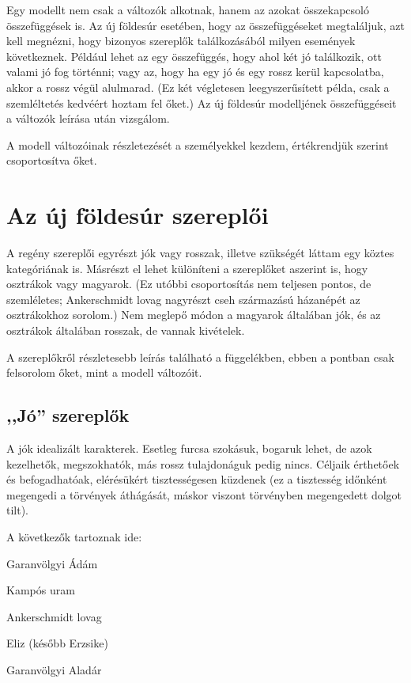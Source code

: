 \documentclass{thesis-ekf}
\begin{document}
    Egy modellt nem csak a változók alkotnak, hanem az azokat összekapcsoló összefüggések is.
    Az új földesúr esetében, hogy az összefüggéseket megtaláljuk, azt kell megnézni, hogy bizonyos szereplők
        találkozásából milyen események következnek.
    Például lehet az egy összefüggés, hogy ahol két jó találkozik, ott valami jó fog történni;
        vagy az, hogy ha egy jó és egy rossz kerül kapcsolatba, akkor a rossz végül alulmarad.
    (Ez két végletesen leegyszerűsített példa, csak a szemléltetés kedvéért hoztam fel őket.)
    Az új földesúr modelljének összefüggéseit a változók leírása után vizsgálom.

    A modell változóinak részletezését a személyekkel kezdem, értékrendjük szerint csoportosítva őket.


    \section{Az új földesúr szereplői}\label{sec:az-uj-foldesur-szereploi}

    A regény szereplői egyrészt jók vagy rosszak, illetve szükségét láttam egy köztes kategóriának is.
    Másrészt el lehet különíteni a szereplőket aszerint is, hogy osztrákok vagy magyarok.
    (Ez utóbbi csoportosítás nem teljesen pontos, de szemléletes;
        Ankerschmidt lovag nagyrészt cseh származású házanépét az osztrákokhoz sorolom.)
    Nem meglepő módon a magyarok általában jók, és az osztrákok általában rosszak, de vannak kivételek.

    A szereplőkről részletesebb leírás található a függelékben, ebben a pontban csak felsorolom őket, mint a modell változóit.

    \subsection{,,Jó'' szereplők}

    A jók idealizált karakterek.
    Esetleg furcsa szokásuk, bogaruk lehet, de azok kezelhetők, megszokhatók, más rossz tulajdonáguk pedig nincs.
    Céljaik érthetőek és befogadhatóak, elérésükért tisztességesen küzdenek
        (ez a tisztesség időnként megengedi a törvények áthágását, máskor viszont törvényben megengedett dolgot tilt).

    A következők tartoznak ide:

    \begin{compactitem}
        \item Garanvölgyi Ádám
        \item Kampós uram
        \item Ankerschmidt lovag
        \item Eliz (később Erzsike)
        \item Garanvölgyi Aladár
    \end{compactitem}
\end{document}

